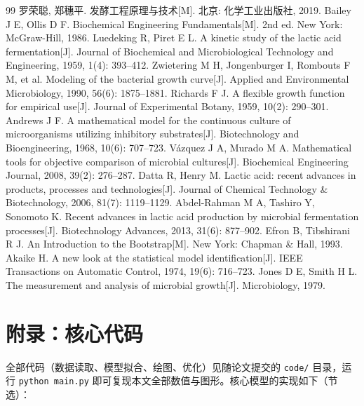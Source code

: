 \begin{thebibliography}{99}
\small
{} 罗荣聪, 郑穗平. 发酵工程原理与技术[M]. 北京: 化学工业出版社, 2019.
 Bailey J E, Ollis D F. Biochemical Engineering Fundamentals[M]. 2nd ed. New York: McGraw-Hill, 1986.
 Luedeking R, Piret E L. A kinetic study of the lactic acid fermentation[J]. Journal of Biochemical and Microbiological Technology and Engineering, 1959, 1(4): 393--412.
 Zwietering M H, Jongenburger I, Rombouts F M, et al. Modeling of the bacterial growth curve[J]. Applied and Environmental Microbiology, 1990, 56(6): 1875--1881.
 Richards F J. A flexible growth function for empirical use[J]. Journal of Experimental Botany, 1959, 10(2): 290--301.
 Andrews J F. A mathematical model for the continuous culture of microorganisms utilizing inhibitory substrates[J]. Biotechnology and Bioengineering, 1968, 10(6): 707--723.
 Vázquez J A, Murado M A. Mathematical tools for objective comparison of microbial cultures[J]. Biochemical Engineering Journal, 2008, 39(2): 276--287.
 Datta R, Henry M. Lactic acid: recent advances in products, processes and technologies[J]. Journal of Chemical Technology \& Biotechnology, 2006, 81(7): 1119--1129.
 Abdel-Rahman M A, Tashiro Y, Sonomoto K. Recent advances in lactic acid production by microbial fermentation processes[J]. Biotechnology Advances, 2013, 31(6): 877--902.
 Efron B, Tibshirani R J. An Introduction to the Bootstrap[M]. New York: Chapman \& Hall, 1993.
 Akaike H. A new look at the statistical model identification[J]. IEEE Transactions on Automatic Control, 1974, 19(6): 716--723.
 Jones D E, Smith H L. The measurement and analysis of microbial growth[J]. Microbiology, 1979.
\end{thebibliography}

\newpage
\appendix
\section*{附录：核心代码}

全部代码（数据读取、模型拟合、绘图、优化）见随论文提交的 \texttt{code/} 目录，运行 \texttt{python main.py} 即可复现本文全部数值与图形。核心模型的实现如下（节选）：

